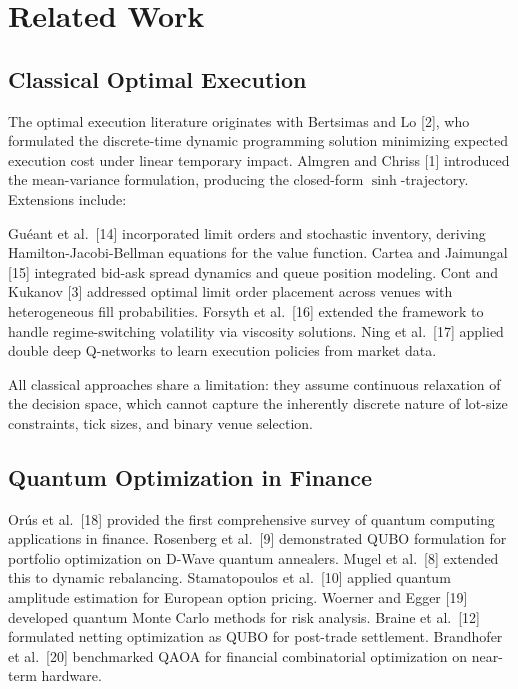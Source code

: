 \documentclass[11pt]{article}
\begin{document}
\section{Related Work}
\label{sec:related}

\subsection{Classical Optimal Execution}

The optimal execution literature originates with Bertsimas and Lo [2], who formulated the discrete-time dynamic programming solution minimizing expected execution cost under linear temporary impact. Almgren and Chriss [1] introduced the mean-variance formulation, producing the closed-form $\sinh$-trajectory. Extensions include:

Gu{\'e}ant et al.\ [14] incorporated limit orders and stochastic inventory, deriving Hamilton-Jacobi-Bellman equations for the value function. Cartea and Jaimungal [15] integrated bid-ask spread dynamics and queue position modeling. Cont and Kukanov [3] addressed optimal limit order placement across venues with heterogeneous fill probabilities. Forsyth et al.\ [16] extended the framework to handle regime-switching volatility via viscosity solutions. Ning et al.\ [17] applied double deep Q-networks to learn execution policies from market data.

All classical approaches share a limitation: they assume continuous relaxation of the decision space, which cannot capture the inherently discrete nature of lot-size constraints, tick sizes, and binary venue selection.

\subsection{Quantum Optimization in Finance}

Or{\'u}s et al.\ [18] provided the first comprehensive survey of quantum computing applications in finance. Rosenberg et al.\ [9] demonstrated QUBO formulation for portfolio optimization on D-Wave quantum annealers. Mugel et al.\ [8] extended this to dynamic rebalancing. Stamatopoulos et al.\ [10] applied quantum amplitude estimation for European option pricing. Woerner and Egger [19] developed quantum Monte Carlo methods for risk analysis. Braine et al.\ [12] formulated netting optimization as QUBO for post-trade settlement. Brandhofer et al.\ [20] benchmarked QAOA for financial combinatorial optimization on near-term hardware.
\end{document}
